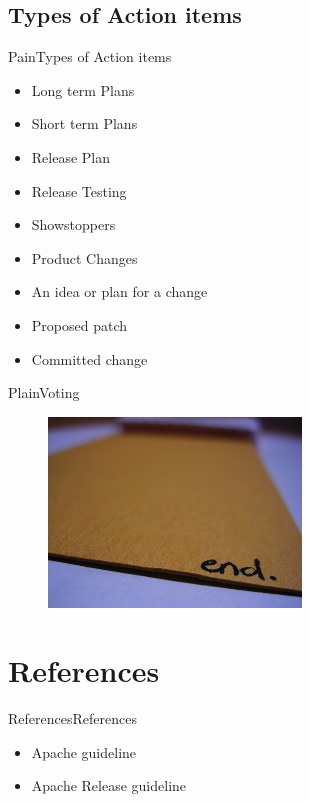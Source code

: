 \documentclass[10pt]{beamer}
\begin{document}
\subsection{Types of Action items}
\begin{frame}{Pain}{Types of Action items}
  \begin{itemize}
    \item Long term Plans
    \item Short term Plans
    \item Release Plan
    \item Release Testing
    \item Showstoppers
    \item Product Changes
    \item An idea or plan for a change
    \item Proposed patch
    \item Committed change
  \end{itemize}
\end{frame}

\begin{frame}{Plain}{Voting}
  \begin{figure}[ht]
    \centering
    \includegraphics[width=0.6\textwidth, keepaspectratio=true]{images/end.jpg}
  \end{figure}
\end{frame}


\section{References}

\begin{frame}{References}{References}
  \begin{itemize}
    \item Apache guideline
    \item Apache Release guideline
  \end{itemize}
\end{frame}
\end{document}
